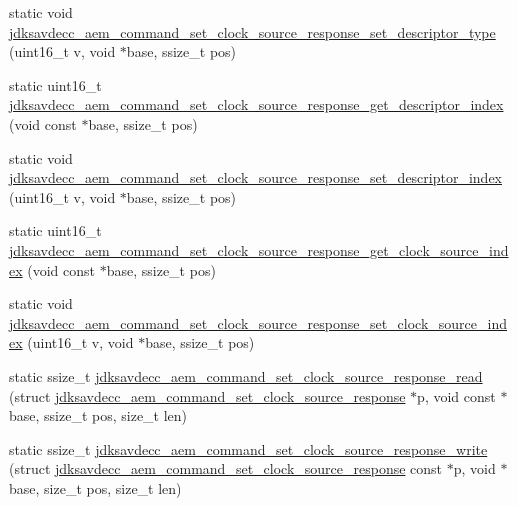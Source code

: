 \begin{DoxyCompactItemize}
static void \hyperlink{group__command__set__clock__source__response_ga2f2a9ab7b29766d9e2a3db53816037f8}{jdksavdecc\+\_\+aem\+\_\+command\+\_\+set\+\_\+clock\+\_\+source\+\_\+response\+\_\+set\+\_\+descriptor\+\_\+type} (uint16\+\_\+t v, void $\ast$base, ssize\+\_\+t pos)
\item 
static uint16\+\_\+t \hyperlink{group__command__set__clock__source__response_gafece94c6286479a3c806d3997c73f3d5}{jdksavdecc\+\_\+aem\+\_\+command\+\_\+set\+\_\+clock\+\_\+source\+\_\+response\+\_\+get\+\_\+descriptor\+\_\+index} (void const $\ast$base, ssize\+\_\+t pos)
\item 
static void \hyperlink{group__command__set__clock__source__response_gaf611e9e1cdf9049ed46699235c40579d}{jdksavdecc\+\_\+aem\+\_\+command\+\_\+set\+\_\+clock\+\_\+source\+\_\+response\+\_\+set\+\_\+descriptor\+\_\+index} (uint16\+\_\+t v, void $\ast$base, ssize\+\_\+t pos)
\item 
static uint16\+\_\+t \hyperlink{group__command__set__clock__source__response_gaff5350e050fff702114026f9230960ec}{jdksavdecc\+\_\+aem\+\_\+command\+\_\+set\+\_\+clock\+\_\+source\+\_\+response\+\_\+get\+\_\+clock\+\_\+source\+\_\+index} (void const $\ast$base, ssize\+\_\+t pos)
\item 
static void \hyperlink{group__command__set__clock__source__response_ga23c6a64f40e033ea307d4fef971c6f5e}{jdksavdecc\+\_\+aem\+\_\+command\+\_\+set\+\_\+clock\+\_\+source\+\_\+response\+\_\+set\+\_\+clock\+\_\+source\+\_\+index} (uint16\+\_\+t v, void $\ast$base, ssize\+\_\+t pos)
\item 
static ssize\+\_\+t \hyperlink{group__command__set__clock__source__response_ga0513a89703f86698de78fd0254d6af48}{jdksavdecc\+\_\+aem\+\_\+command\+\_\+set\+\_\+clock\+\_\+source\+\_\+response\+\_\+read} (struct \hyperlink{structjdksavdecc__aem__command__set__clock__source__response}{jdksavdecc\+\_\+aem\+\_\+command\+\_\+set\+\_\+clock\+\_\+source\+\_\+response} $\ast$p, void const $\ast$base, ssize\+\_\+t pos, size\+\_\+t len)
\item 
static ssize\+\_\+t \hyperlink{group__command__set__clock__source__response_ga941084e3c6e7b975b474e1c1dbeabc6f}{jdksavdecc\+\_\+aem\+\_\+command\+\_\+set\+\_\+clock\+\_\+source\+\_\+response\+\_\+write} (struct \hyperlink{structjdksavdecc__aem__command__set__clock__source__response}{jdksavdecc\+\_\+aem\+\_\+command\+\_\+set\+\_\+clock\+\_\+source\+\_\+response} const $\ast$p, void $\ast$base, size\+\_\+t pos, size\+\_\+t len)
\end{DoxyCompactItemize}


